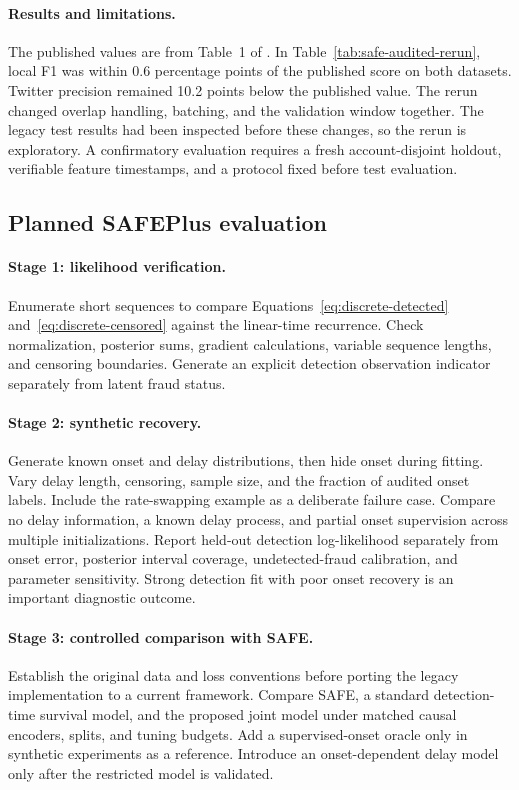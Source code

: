 \paragraph{Results and limitations.}
The published values are from Table~1 of \cite{zheng2019safe}.
In Table~\ref{tab:safe-audited-rerun}, local F1 was within 0.6
percentage points of the published score on both datasets. Twitter
precision remained 10.2 points below the published value.
The rerun changed overlap handling, batching, and the validation
window together. The legacy test results had been inspected before
these changes, so the rerun is exploratory. A confirmatory evaluation
requires a fresh account-disjoint holdout, verifiable feature
timestamps, and a protocol fixed before test evaluation.

\subsection{Planned SAFEPlus evaluation}
\paragraph{Stage 1: likelihood verification.}
Enumerate short sequences to compare Equations~\ref{eq:discrete-detected}
and~\ref{eq:discrete-censored} against the linear-time recurrence. Check
normalization, posterior sums, gradient calculations, variable sequence
lengths, and censoring boundaries. Generate an explicit detection observation
indicator separately from latent fraud status.

\paragraph{Stage 2: synthetic recovery.}
Generate known onset and delay distributions, then hide onset during fitting.
Vary delay length, censoring, sample size, and the fraction of audited onset
labels. Include the rate-swapping example as a deliberate failure case.
Compare no delay information, a known delay process, and partial onset
supervision across multiple initializations. Report held-out detection
log-likelihood separately from onset error, posterior interval coverage,
undetected-fraud calibration, and parameter sensitivity. Strong detection fit
with poor onset recovery is an important diagnostic outcome.

\paragraph{Stage 3: controlled comparison with SAFE.}
Establish the original data and loss conventions before porting the legacy
implementation to a current framework. Compare SAFE, a standard detection-time
survival model, and the proposed joint model under matched causal encoders,
splits, and tuning budgets. Add a supervised-onset oracle only in synthetic
experiments as a reference. Introduce an onset-dependent delay model only
after the restricted model is validated.

